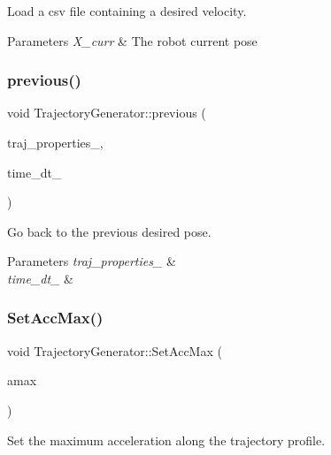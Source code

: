 Load a csv file containing a desired velocity. 


\begin{DoxyParams}{Parameters}
{\em X\+\_\+curr} & The robot current pose \\
\hline
\end{DoxyParams}
\mbox{\label{class_trajectory_generator_aee649f0687ae2ede88f2c6bb97aac7a8}} 
\subsubsection{\texorpdfstring{previous()}{previous()}}
{\footnotesize\ttfamily void Trajectory\+Generator\+::previous (\begin{DoxyParamCaption}\item[{panda\+\_\+traj\+::\+Traj\+Properties}]{traj\+\_\+properties\+\_\+,  }\item[{double}]{time\+\_\+dt\+\_\+ }\end{DoxyParamCaption})}



Go back to the previous desired pose. 


\begin{DoxyParams}{Parameters}
{\em traj\+\_\+properties\+\_\+} & \\
\hline
{\em time\+\_\+dt\+\_\+} & \\
\hline
\end{DoxyParams}
\mbox{\label{class_trajectory_generator_a4a9bbab31d78a11ad80778ac83e8713d}} 
\subsubsection{\texorpdfstring{Set\+Acc\+Max()}{SetAccMax()}}
{\footnotesize\ttfamily void Trajectory\+Generator\+::\+Set\+Acc\+Max (\begin{DoxyParamCaption}\item[{double}]{amax }\end{DoxyParamCaption})}



Set the maximum acceleration along the trajectory profile. 


